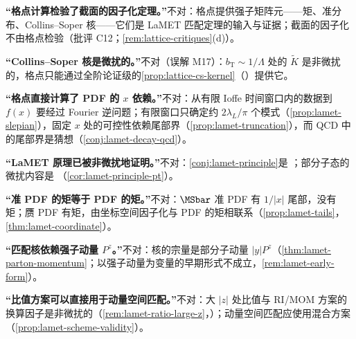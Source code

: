 \begin{tcolorbox}[enhanced,breakable,title=本章澄清的常见误解,fonttitle=\bfseries,
  colback=gray!3!white,colframe=gray!55!black,boxrule=0.6pt,arc=2pt,
  left=5pt,right=5pt,top=3pt,bottom=3pt,before skip=6pt,after skip=6pt]
\textbf{“格点计算检验了截面的因子化定理。”}不对：格点提供强子矩阵元——矩、准分布、Collins--Soper 核——它们是 LaMET 匹配定理的输入与证据；截面的因子化不由格点检验（批评 C12；\cref{rem:lattice-critiques}(d)）。\par
\textbf{“Collins--Soper 核是微扰的。”}不对（误解 M17）：$b_{\mathrm T}\sim1/\Lambda$ 处的 $\tilde K$ 是非微扰的，格点只能通过全阶论证级的\cref{prop:lattice-cs-kernel}（\tagA）提供它。\par
\textbf{“格点直接计算了 PDF 的 $x$ 依赖。”}不对：从有限 Ioffe 时间窗口内的数据到 $f(x)$ 要经过 Fourier 逆问题；有限窗口只确定约 $2\lambda_L/\pi$ 个模式（\cref{prop:lamet-slepian}），固定 $x$ 处的可控性依赖尾部界（\cref{prop:lamet-truncation}），而 QCD 中的尾部界是猜想（\cref{conj:lamet-decay-qcd}）。\par
\textbf{“LaMET 原理已被非微扰地证明。”}不对：\cref{conj:lamet-principle}是 \tagC；部分子态的微扰内容是 \tagA（\cref{cor:lamet-principle-pt}）。\par
\textbf{“准 PDF 的矩等于 PDF 的矩。”}不对：$\MSbar$ 准 PDF 有 $1/|x|$ 尾部，没有矩；赝 PDF 有矩，由坐标空间因子化与 PDF 的矩相联系（\cref{prop:lamet-tails}，\cref{thm:lamet-coordinate}）。\par
\textbf{“匹配核依赖强子动量 $P^z$。”}不对：核的宗量是部分子动量 $|y|P^z$（\cref{thm:lamet-parton-momentum}；以强子动量为变量的早期形式不成立，\cref{rem:lamet-early-form}）。\par
\textbf{“比值方案可以直接用于动量空间匹配。”}不对：大 $|z|$ 处比值与 RI/MOM 方案的换算因子是非微扰的（\cref{rem:lamet-ratio-large-z}，\tagC）；动量空间匹配应使用混合方案（\cref{prop:lamet-scheme-validity}）。
\end{tcolorbox}
